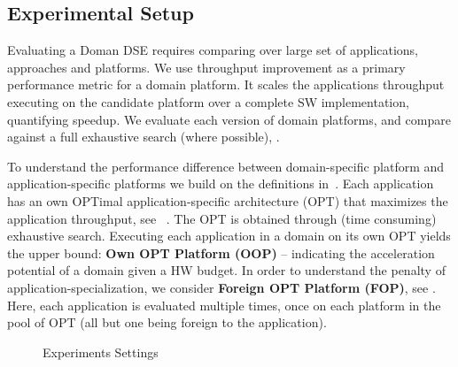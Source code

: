 \subsection{Experimental Setup}

Evaluating a Doman DSE requires comparing over large set of applications, approaches and platforms. We use throughput improvement as a primary performance metric for a domain platform. It scales the applications throughput executing on the candidate platform over a complete SW implementation, quantifying speedup. We evaluate  each version of \ga domain platforms, 
and compare against a full exhaustive search (where possible),  .


To understand the performance difference between domain-specific platform and application-specific platforms we build on the definitions in~\cite{zhang100ds}. Each application has an own OPTimal application-specific architecture (OPT) that maximizes the application throughput, see ~. 
The OPT is obtained through (time consuming) exhaustive search. 
Executing each application in a domain on its own OPT yields the upper bound: \textbf{Own OPT Platform (OOP)} -- indicating the acceleration potential of a domain given a HW budget. In order to understand the penalty of application-specialization, we consider \textbf{Foreign OPT Platform (FOP)}, see . Here, each application is evaluated multiple times, once on each platform in the pool of OPT (all but one being foreign to the application).



\begin{figure}[h]
	\centering
		\hfill
		\hfill
	\caption{Experiments Settings}
\end{figure}



